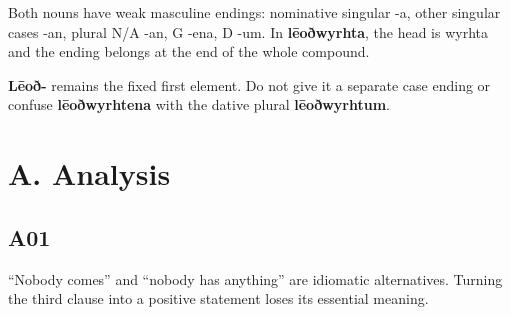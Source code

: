\begin{minipage}{\linewidth}
Both nouns have weak masculine endings: nominative singular -a, other singular cases -an, plural N/\allowbreak{}A -an, G -ena, D -um. In \textbf{lēoðwyrhta}, the head is wyrhta and the ending belongs at the end of the whole compound.

\textbf{Lēoð-} remains the fixed first element. Do not give it a separate case ending or confuse \textbf{lēoðwyrhtena} with the dative plural \textbf{lēoðwyrhtum}.

\end{minipage}\par\addvspace{4pt}

\section*{A. Analysis}

\subsection*{A01}

\par\begin{minipage}{\linewidth}\raggedright



“Nobody comes” and “nobody has anything” are idiomatic alternatives. Turning the third clause into a positive statement loses its essential meaning.

\end{minipage}\par\addvspace{4pt}

